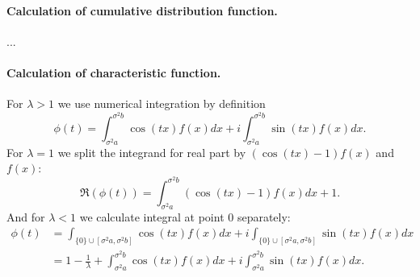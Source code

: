 \documentclass[a4paper,11pt]{article}
\theoremstyle{plain}
\theoremstyle{definition}
\begin{document}
	\paragraph{Calculation of cumulative distribution function.}
	...
	
	\paragraph{Calculation of characteristic function.}
	For $\lambda > 1$ we use numerical integration by definition
	\[
	\phi(t) = \int_{\sigma^2 a}^{\sigma^2 b} \cos(tx) f(x) dx + i \int_{\sigma^2 a}^{\sigma^2 b}  \sin(tx) f(x) dx.
	\]
	For $\lambda = 1$ we split the integrand for real part by $(\cos(tx) - 1) f(x)$ and $f(x)$:
	\[ \Re(\phi(t)) =  \int_{\sigma^2 a}^{\sigma^2 b} (\cos(tx)-1) f(x) dx + 1.\]
	And for $\lambda < 1$ we calculate integral at point $0$ separately:
	\[
	\begin{aligned}
	\phi(t) & = \int_{ \{0\} \cup [\sigma^2 a, \sigma^2 b]} \cos(tx) f(x) dx + i \int_{ \{0\} \cup [\sigma^2 a, \sigma^2 b]} \sin(tx) f(x) dx  \\ 
	& = 1-\frac{1}{\lambda} + \int_{\sigma^2 a}^{\sigma^2 b} \cos(tx) f(x) dx + i \int_{\sigma^2 a}^{\sigma^2 b}  \sin(tx) f(x) dx.
	\end{aligned}
	\]
	
	
	\pagebreak
\end{document}
